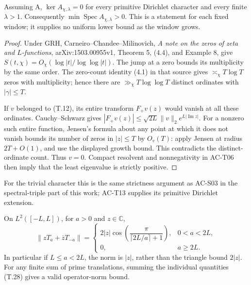 \begin{corollary}
\label{AC-T13}
Assuming A, \(\ker A_{\chi,\lambda}=0\) for
every primitive Dirichlet character and every
finite \(\lambda>1\). Consequently
\(\min\operatorname{Spec}A_{\chi,\lambda}>0\).
This is a statement for each fixed window;
it supplies no uniform lower bound as the
window grows.
\end{corollary}

\begin{proof}
Under GRH, Carneiro--Chandee--Milinovich,
\emph{A note on the zeros of zeta and
\(L\)-functions}, arXiv:1503.00955v1,
Theorem 5, (4.4), and Example 8, give
\(S(t,\chi)=O_\chi(\log|t|/\log\log|t|)\).
The jump at a zero bounds its multiplicity
by the same order. The
zero-count identity (4.1) in that source gives
\(\asymp_\chi T\log T\) zeros with multiplicity; hence there
are \(\gg_\chi T\log\log T\) distinct
ordinates with \(|\gamma|\leq T\).

If \(v\) belonged to (T.12), its entire
transform \(F_+v(z)\) would vanish at all
these ordinates. Cauchy--Schwarz gives
\(|F_+v(z)|\leq\sqrt{2L}\|v\|_2e^{L|\operatorname{Im}z|}\).
For a nonzero such entire function,
Jensen's formula about any point at
which it does not vanish bounds its
number of zeros in \(|z|\leq T\) by
\(O_v(T)\): apply Jensen at radius
\(2T+O(1)\), and use the displayed
growth bound. This contradicts the
distinct-ordinate count. Thus \(v=0\).
Compact resolvent and nonnegativity
in AC-T06 then imply that the least
eigenvalue is strictly positive.
\end{proof}

For the trivial character this is the
same strictness argument as AC-S03
in the spectral-triple part of this
work; AC-T13 supplies its primitive
Dirichlet extension.

\begin{proposition}
\label{AC-T14}
On \(L^2([-L,L])\), for \(a>0\) and \(z\in\mathbb C\),
\[
 \|zT_a+\overline zT_{-a}\|=
 \begin{cases}
  2|z|\cos\!\left(\dfrac{\pi}
             {\lceil 2L/a\rceil+1}\right),&0<a<2L,\\
  0,&a\geq2L.
 \end{cases}                                                 \tag{T.28}
\]
In particular if \(L\leq a<2L\), the norm
is \(|z|\), rather than the triangle
bound \(2|z|\). For any finite sum
of prime translations, summing the
individual quantities (T.28) gives
a valid operator-norm bound.
\end{proposition}

